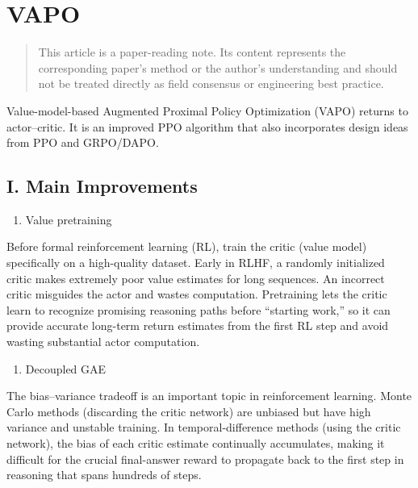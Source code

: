 \setcounter{section}{1}

\hypertarget{vapo}{%
\section{VAPO}\label{vapo}}

\begin{quote}
This article is a paper-reading note. Its content represents the corresponding paper's method or the author's understanding and should not be treated directly as field consensus or engineering best practice.
\end{quote}

Value-model-based Augmented Proximal Policy Optimization (VAPO) returns to actor--critic. It is an improved PPO algorithm that also incorporates design ideas from PPO and GRPO/DAPO.

\hypertarget{i.-main-improvements}{%
\subsection{I. Main Improvements}\label{i.-main-improvements}}

\begin{enumerate}
\def\labelenumi{\arabic{enumi}.}
\tightlist
\item
  Value pretraining
\end{enumerate}

Before formal reinforcement learning (RL), train the critic (value model) specifically on a high-quality dataset. Early in RLHF, a randomly initialized critic makes extremely poor value estimates for long sequences. An incorrect critic misguides the actor and wastes computation. Pretraining lets the critic learn to recognize promising reasoning paths before ``starting work,'' so it can provide accurate long-term return estimates from the first RL step and avoid wasting substantial actor computation.

\begin{enumerate}
\def\labelenumi{\arabic{enumi}.}
\setcounter{enumi}{1}
\tightlist
\item
  Decoupled GAE
\end{enumerate}

The bias--variance tradeoff is an important topic in reinforcement learning. Monte Carlo methods (discarding the critic network) are unbiased but have high variance and unstable training. In temporal-difference methods (using the critic network), the bias of each critic estimate continually accumulates, making it difficult for the crucial final-answer reward to propagate back to the first step in reasoning that spans hundreds of steps.

